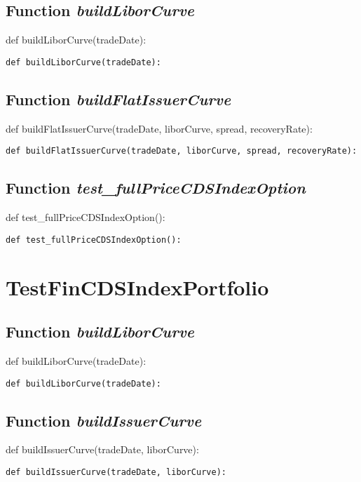 \documentclass[twoside,11pt]{book}
\begin{document}
\subsection{Function {\it buildLiborCurve}}
def buildLiborCurve(tradeDate):

\begin{lstlisting}
def buildLiborCurve(tradeDate):
\end{lstlisting}

\subsection{Function {\it buildFlatIssuerCurve}}
def buildFlatIssuerCurve(tradeDate, liborCurve, spread, recoveryRate):

\begin{lstlisting}
def buildFlatIssuerCurve(tradeDate, liborCurve, spread, recoveryRate):
\end{lstlisting}

\subsection{Function {\it test\_fullPriceCDSIndexOption}}
def test\_fullPriceCDSIndexOption():

\begin{lstlisting}
def test_fullPriceCDSIndexOption():
\end{lstlisting}


\newpage
\section{TestFinCDSIndexPortfolio}

\subsection{Function {\it buildLiborCurve}}
def buildLiborCurve(tradeDate):

\begin{lstlisting}
def buildLiborCurve(tradeDate):
\end{lstlisting}

\subsection{Function {\it buildIssuerCurve}}
def buildIssuerCurve(tradeDate, liborCurve):

\begin{lstlisting}
def buildIssuerCurve(tradeDate, liborCurve):
\end{lstlisting}
\end{document}

